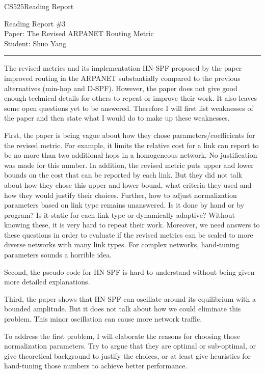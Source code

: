 \documentclass[11pt]{article}
\def\CourseCode{CS525}
\def\ReportNo{3}
\def\Category{Reading Report}
\def\PaperTitle{The Revised ARPANET Routing Metric}
\def\Author{Shuo Yang}
\begin{document}
\noindent

\CourseCode \hfill \Category

\begin{center}
Reading Report \#\ReportNo\\
Paper: \PaperTitle\\
Student: \Author\\
\end{center}

\hrule\smallskip
\vspace{1.5em}

The revised metrics and its implementation HN-SPF proposed by the
paper improved routing in the ARPANET substantially compared to the
previous alternatives (min-hop and D-SPF). However, the paper does not
give good enough technical details for others to repeat or improve their
work. It also leaves some open questions yet to be answered. Therefore
I will first list weaknesses of the paper and then state what I would
do to make up these weaknesses.

First, the paper is being vague about how they chose
parameters/coefficients for the revised metric.
For example, it limits the relative cost for a link can
report to be no more than two additional hops in a homogeneous
network. No justification was made for this number.
In addition, the revised metric puts upper and
lower bounds on the cost that can be reported by each link. But they
did not talk about how they chose this upper and lower bound, what
criteria they used and how they would justify their choices. Further,
how to adjust normalization parameters based on link type remains
unanswered. Is it done by 
hand or by program? Is it static for each link type or dynamically
adaptive?
Without knowing these, it is very hard to repeat their work. Moreover,
we need answers to these questions in order to evaluate if the revised
metrics can be scaled to more diverse networks with many link
types. For complex networks, hand-tuning parameters sounds a horrible
idea. 


Second, the pseudo code for HN-SPF is hard to understand without being
given more detailed explanations.

Third, the paper shows that HN-SPF can oscillate around its
equilibrium with a bounded amplitude. But it does not talk about how
we could eliminate this problem. This minor oscillation can cause more
network traffic.

To address the first problem, I will elaborate the reasons for
choosing those normalization parameters. Try to argue that they are
optimal or sub-optimal, or give theoretical background to justify the
choices, or at least give heuristics for hand-tuning those
numbers to achieve better performance.
\end{document}
